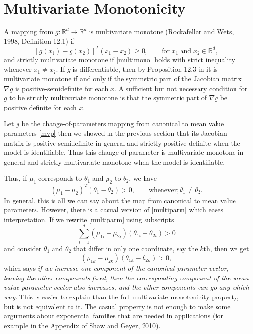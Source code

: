 \documentclass[12pt]{article}
\newcommand{\R}{\mathbb{R}}
\begin{document}
\section*{Multivariate Monotonicity}
A mapping from $g : \R^d \to \R^d$ is multivariate monotone (Rockafellar and Wets, 1998, Definition 12.1) if
\begin{equation} \label{multimono}
  \left[g(x_1) - g(x_2)\right]^T(x_1 - x_2) \geq 0, \qquad \text{for} \; x_1 \; \text{and} \; x_2 \in \R^d,	
\end{equation}
and strictly multivariate monotone if \eqref{multimono} holds with strict inequality whenever $x_1 \neq x_2$. If $g$ is differentiable, then by Proposition 12.3 in \cite{rockafellar2009variational} it is multivariate monotone if and only if the symmetric part of the Jacobian matrix $\nabla g$ is positive-semidefinite for each $x$. A sufficient but not necessary condition for $g$ to be strictly multivariate monotone is that the symmetric part of $\nabla g$ be positive definite for each $x$.

Let $g$ be the change-of-parameters mapping from canonical to mean value parameters \eqref{mvp} then we showed in the previous section that its Jacobian matrix is positive semidefinite in general and strictly positive definite when the model is identifiable. Thus this change-of-parameter is multivariate monotone in general and strictly multivariate monotone when the model is identifiable.

Thus, if $\mu_1$ corresponds to $\theta_1$ and $\mu_2$ to $\theta_2$, we have
\begin{equation} \label{multiparm}
  (\mu_1 - \mu_2)^T(\theta_1 - \theta_2) > 0, \qquad \text{whenever} ; \theta_1 \neq \theta_2.	
\end{equation}
In general, this is all we can say about the map from canonical to mean value parameters. However, there is a casual version of \eqref{multiparm} which eases interpretation. If we rewrite \eqref{multiparm} using subscripts
$$
  \sum_{i=1}^d(\mu_{1i} - \mu_{2i})(\theta_{1i} - \theta_{2i}) > 0
$$
and consider $\theta_1$ and $\theta_2$ that differ in only one coordinate, say the $k$th, then we get
$$
  (\mu_{1k} - \mu_{2k})(\theta_{1k} - \theta_{2k}) > 0,
$$
which says \emph{if we increase one component of the canonical parameter vector, leaving the other components fixed, then the corresponding component of the mean value parameter vector also increases, and the other components can go any which way}. This is easier to explain than the full multivariate monotonicity property, but is not equivalent to it. The casual property is not enough to make some arguments about exponential families that are needed in applications (for example in the Appendix of Shaw and Geyer, 2010).
\end{document}
